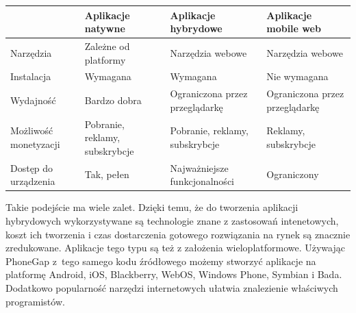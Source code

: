 \documentclass[brudnopis]{xmgr}
\begin{document}
\begin{center}
    \begin{tabular}{ |  p{2cm} | p{4cm} | p{4cm} | p{4cm} |}
    \hline
   			& Aplikacje natywne        & Aplikacje hybrydowe 	& Aplikacje mobile web 			\\ \hline
    Narzędzia	& Zależne od platformy	&   Narzędzia webowe	& 	Narzędzia webowe			\\ \hline
    Instalacja	&        Wymagana               &	 Wymagana         	& 		Nie wymagana		\\ \hline
    Wydajność	& 	Bardzo dobra		&Ograniczona przez przeglądarkę&Ograniczona przez przeglądarkę\\ \hline
    Możliwość monetyzacji
    			&  Pobranie, reklamy, subskrybcje  & Pobranie, reklamy, subskrybcje & Reklamy, subskrybcje \\ \hline
    Dostęp do urządzenia
    			& 	Tak, pełen  	         &Najważniejsze funkcjonalności& Ograniczony        \\ \hline
    \end{tabular}
\end{center}

Takie podejście ma wiele zalet. Dzięki temu, że do tworzenia aplikacji hybrydowych wykorzystywane są technologie
znane z zastosowań intenetowych, koszt ich tworzenia i czas dostarczenia
gotowego rozwiązania na rynek są znacznie zredukowane. Aplikacje tego typu są też
z założenia wieloplatformowe. Używając PhoneGap z~tego samego kodu źródłowego
możemy stworzyć aplikacje na platformę Android, iOS, Blackberry, WebOS,
Windows Phone, Symbian i Bada. Dodatkowo popularność narzędzi internetowych
ułatwia znalezienie właściwych programistów.
\end{document}
